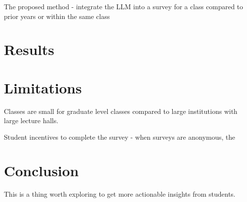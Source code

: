 \documentclass[11pt]{article}
\begin{document}
The proposed method - integrate the LLM into a survey for a class compared to prior years or within the same class 


\section{Results}

\section{Limitations}
Classes are small for graduate level classes compared to large institutions with large lecture halls. 

Student incentives to complete the survey - when surveys are anonymous, the 

\section{Conclusion}
This is a thing worth exploring to get more actionable insights from students. 

{}


\end{document}
